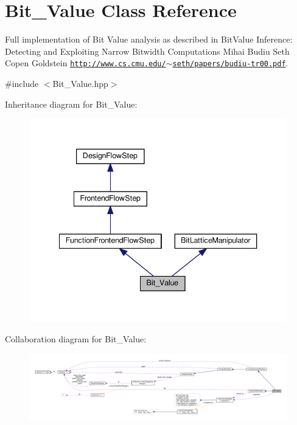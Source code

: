 \hypertarget{classBit__Value}{}\section{Bit\+\_\+\+Value Class Reference}
\label{classBit__Value}


Full implementation of Bit Value analysis as described in Bit\+Value Inference\+: Detecting and Exploiting Narrow Bitwidth Computations Mihai Budiu Seth Copen Goldstein \href{http://www.cs.cmu.edu/~seth/papers/budiu-tr00.pdf}{\tt http\+://www.\+cs.\+cmu.\+edu/$\sim$seth/papers/budiu-\/tr00.\+pdf}.  




{\ttfamily \#include $<$Bit\+\_\+\+Value.\+hpp$>$}



Inheritance diagram for Bit\+\_\+\+Value\+:
\nopagebreak
\begin{figure}[H]
\begin{center}
\leavevmode
\includegraphics[width=340pt]{db/dcf/classBit__Value__inherit__graph}
\end{center}
\end{figure}


Collaboration diagram for Bit\+\_\+\+Value\+:
\nopagebreak
\begin{figure}[H]
\begin{center}
\leavevmode
\includegraphics[width=350pt]{dd/d24/classBit__Value__coll__graph}
\end{center}
\end{figure}
